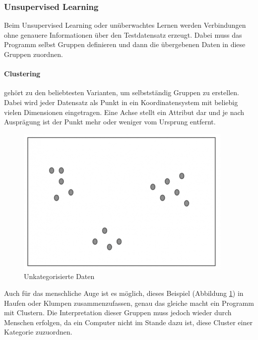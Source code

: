 \subsubsection{Unsupervised Learning}

Beim Unsupervised Learning oder unüberwachtes Lernen werden Verbindungen ohne genauere Informationen über den Testdatensatz erzeugt. Dabei muss das Programm selbst Gruppen definieren und dann die übergebenen Daten in diese Gruppen zuordnen. \cite{SL:online}

\paragraph{Clustering} gehört zu den beliebtesten Varianten, um selbstständig Gruppen zu erstellen. Dabei wird jeder Datensatz als Punkt in ein Koordinatensystem mit beliebig vielen Dimensionen eingetragen. Eine Achse stellt ein Attribut dar und je nach Ausprägung ist der Punkt mehr oder weniger vom Ursprung entfernt.

\begin{figure}[H]
      \centering
      \includegraphics[scale=0.8]{sections/machine-learning/images/unclustered-data.png}
      \caption{Unkategorisierte Daten}
      \label{fig:unclustered-data}
\end{figure}

Auch für das menschliche Auge ist es möglich, dieses Beispiel (Abbildung \ref{fig:unclustered-data}) in Haufen oder Klumpen zusammenzufassen, genau das gleiche macht ein Programm mit Clustern. Die Interpretation dieser Gruppen muss jedoch wieder durch Menschen erfolgen, da ein Computer nicht im Stande dazu ist, diese Cluster einer Kategorie zuzuordnen.

